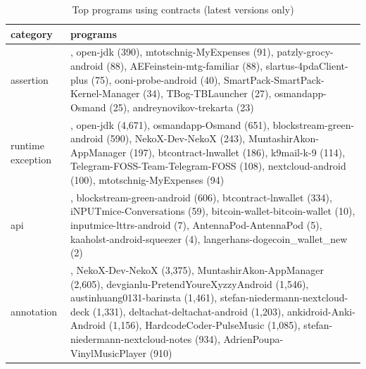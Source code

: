 \begin{table}[]
\centering
\caption{Top programs using contracts (latest versions only)}
\label{tab:topusers}
\begin{tabular}{|p{2.0cm}|p{6.0cm}|} \hline
   category & programs \\ \hline
assertion & , open-jdk (390), mtotschnig-MyExpenses (91), patzly-grocy-android (88), AEFeinstein-mtg-familiar (88), slartus-4pdaClient-plus (75), ooni-probe-android (40), SmartPack-SmartPack-Kernel-Manager (34), TBog-TBLauncher (27), osmandapp-Osmand (25), andreynovikov-trekarta (23) \\ 
runtime exception & , open-jdk (4,671), osmandapp-Osmand (651), blockstream-green-android (590), NekoX-Dev-NekoX (243), MuntashirAkon-AppManager (197), btcontract-lnwallet (186), k9mail-k-9 (114), Telegram-FOSS-Team-Telegram-FOSS (108), nextcloud-android (100), mtotschnig-MyExpenses (94) \\ 
api & , blockstream-green-android (606), btcontract-lnwallet (334), iNPUTmice-Conversations (59), bitcoin-wallet-bitcoin-wallet (10), inputmice-lttrs-android (7), AntennaPod-AntennaPod (5), kaaholst-android-squeezer (4), langerhans-dogecoin_wallet_new (2) \\ 
annotation & , NekoX-Dev-NekoX (3,375), MuntashirAkon-AppManager (2,605), devgianlu-PretendYoureXyzzyAndroid (1,546), austinhuang0131-barinsta (1,461), stefan-niedermann-nextcloud-deck (1,331), deltachat-deltachat-android (1,203), ankidroid-Anki-Android (1,156), HardcodeCoder-PulseMusic (1,085), stefan-niedermann-nextcloud-notes (934), AdrienPoupa-VinylMusicPlayer (910) \\ 
\hline
\end{tabular}
\end{table}

